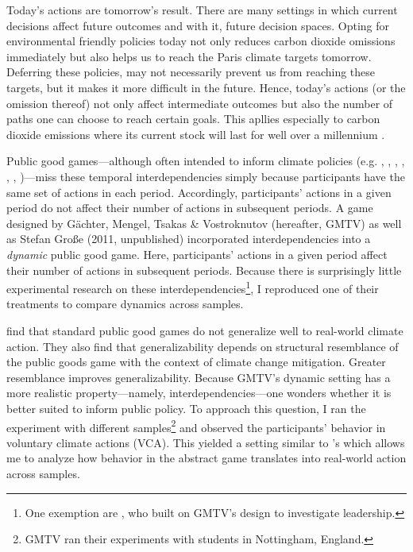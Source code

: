 \documentclass[
  authoryear,
  preprint,
  3p]{elsarticle}
\begin{document}
Today's actions are tomorrow's result. There are many settings in which
current decisions affect future outcomes and with it, future decision
spaces. Opting for environmental friendly policies today not only
reduces carbon dioxide omissions immediately but also helps us to reach
the Paris climate targets tomorrow. Deferring these policies, may not
necessarily prevent us from reaching these targets, but it makes it more
difficult in the future. Hence, today's actions (or the omission
thereof) not only affect intermediate outcomes but also the number of
paths one can choose to reach certain goals. This apllies especially to
carbon dioxide emissions where its current stock will last for well over
a millennium \citep{Inman2008, CalzolariEtAl2018}.

Public good games---although often intended to inform climate policies
(e.g. \citet{MilinskiEtAl2006}, \citet{TavoniEtAl2011},
\citet{Hauser2014}, \citet{BrickEtAl2015}, \citet{GomezEtAl2018},
\citet{CalzolariEtAl2018}, \citet{CookEtAl2019})---miss these temporal
interdependencies simply because participants have the same set of
actions in each period. Accordingly, participants' actions in a given
period do not affect their number of actions in subsequent periods. A
game designed by Gächter, Mengel, Tsakas \& Vostroknutov
\citeyearpar{GMTV2017} (hereafter, GMTV) as well as Stefan Große (2011,
unpublished) incorporated interdependencies into a \emph{dynamic} public
good game. Here, participants' actions in a given period affect their
number of actions in subsequent periods. Because there is surprisingly
little experimental research on these interdependencies\footnote{One
  exemption are \citet{Moser2019}, who built on GMTV's design to
  investigate leadership.}, I reproduced one of their treatments to
compare dynamics across samples.

\citet{GKLS2020} find that standard public good games do not generalize
well to real-world climate action. They also find that generalizability
depends on structural resemblance of the public goods game with the
context of climate change mitigation. Greater resemblance improves
generalizability. Because GMTV's dynamic setting has a more realistic
property---namely, interdependencies---one wonders whether it is better
suited to inform public policy. To approach this question, I ran the
experiment with different samples\footnote{GMTV ran their experiments
  with students in Nottingham, England.} and observed the participants'
behavior in voluntary climate actions (VCA). This yielded a setting
similar to \citet{GKLS2020}'s which allows me to analyze how behavior in
the abstract game translates into real-world action across samples.
\end{document}
